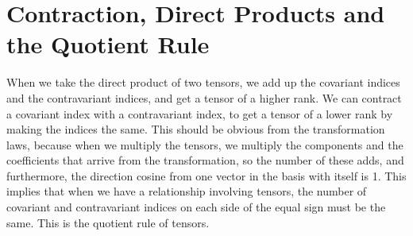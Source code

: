 \documentclass[11pt,notitlepage]{article}
\begin{document}
\section{Contraction, Direct Products and the Quotient Rule}
When we take the direct product of two tensors, we add up the covariant indices and the contravariant indices, and get a tensor of a higher rank. We can contract a covariant index with a contravariant index, to get a tensor of a lower rank by making the indices the same. This should be obvious from the transformation laws, because when we multiply the tensors, we multiply the components and the coefficients that arrive from the transformation, so the number of these adds, and furthermore, the direction cosine from one vector in the basis with itself is 1. 
This implies that when we have a relationship involving tensors, the number of covariant and contravariant indices on each side of the equal sign must be the same. This is the quotient rule of tensors.
\end{document}
